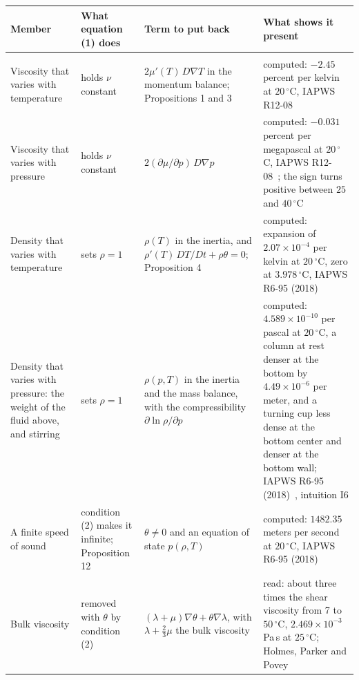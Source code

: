 \begingroup
\small
\begin{longtable}{@{}>{\raggedright\arraybackslash}p{}%
>{\raggedright\arraybackslash}p{}%
>{\raggedright\arraybackslash}p{}%
>{\raggedright\arraybackslash}p{}@{}}
\toprule
Member & What equation (1) does & Term to put back & What shows it present \\
\midrule
\endhead
\bottomrule
\endfoot
\multicolumn{4}{@{}l}{\textbf{In} $P_{\mathrm{all}}$} \\[0.3em]
Viscosity that varies with temperature
& holds $\nu$ constant
& $2\mu'(T)\,D\nabla T$ in the momentum balance; Propositions 1 and 3
& computed: $-2.45$ percent per kelvin at $20\,^\circ$C, IAPWS R12-08~\cite{src:IAPWS-R12-08} \\[0.5em]
Viscosity that varies with pressure
& holds $\nu$ constant
& $2(\partial\mu/\partial p)\,D\nabla p$
& computed: $-0.031$ percent per megapascal at $20\,^\circ$C, IAPWS R12-08~\cite{src:IAPWS-R12-08}; the sign turns
positive between $25$ and $40\,^\circ$C \\[0.5em]
Density that varies with temperature
& sets $\rho = 1$
& $\rho(T)$ in the inertia, and $\rho'(T)\,DT/Dt + \rho\theta = 0$; Proposition 4
& computed: expansion of $2.07\times 10^{-4}$ per kelvin at $20\,^\circ$C, zero at
$3.978\,^\circ$C, IAPWS R6-95 (2018)~\cite{src:IAPWS-R6-95-2018} \\[0.5em]
Density that varies with pressure: the weight of the fluid above, and stirring
& sets $\rho = 1$
& $\rho(p,T)$ in the inertia and the mass balance, with the compressibility
$\partial\ln\rho/\partial p$
& computed: $4.589\times 10^{-10}$ per pascal at $20\,^\circ$C, a column at rest denser at the
bottom by $4.49\times 10^{-6}$ per meter, and a turning cup less dense at the bottom center and
denser at the bottom wall; IAPWS R6-95 (2018)~\cite{src:IAPWS-R6-95-2018}, intuition I6 \\[0.5em]
A finite speed of sound
& condition (2) makes it infinite; Proposition 12
& $\theta \neq 0$ and an equation of state $p(\rho,T)$
& computed: $1482.35$ meters per second at $20\,^\circ$C, IAPWS R6-95 (2018)~\cite{src:IAPWS-R6-95-2018} \\[0.5em]
Bulk viscosity
& removed with $\theta$ by condition (2)
& $(\lambda+\mu)\nabla\theta + \theta\nabla\lambda$, with $\lambda + \tfrac23\mu$ the bulk viscosity
& read: about three times the shear viscosity from 7 to $50\,^\circ$C, $2.469\times 10^{-3}$
Pa\,s at $25\,^\circ$C; Holmes, Parker and Povey~\cite{src:Holmes-Parker-Povey-2011} \\[0.5em]

\end{longtable}
